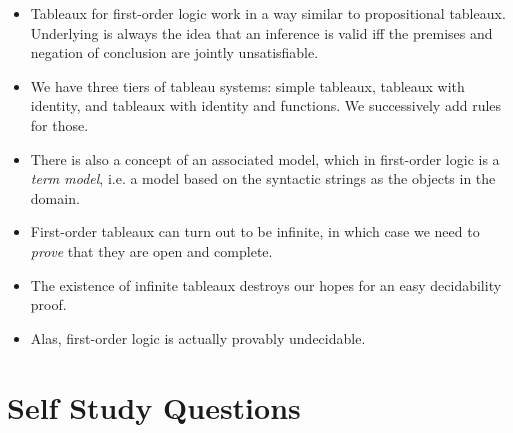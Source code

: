 \begin{itemize}
	
		\item Tableaux for first-order logic work in a way similar to propositional tableaux. Underlying is always the idea that an inference is valid iff the premises and negation of conclusion are jointly unsatisfiable.				
		\item We have three tiers of tableau systems: simple tableaux, tableaux with identity, and tableaux with identity and functions. We successively add rules for those.
		
		\item There is also a concept of an associated model, which in first-order logic is a \emph{term model}, i.e. a model based on the syntactic strings as the objects in the domain.
		
		\item First-order tableaux can turn out to be infinite, in which case we need to \emph{prove} that they are open and complete.
		
		\item The existence of infinite tableaux destroys our hopes for an easy decidability proof.
		
		\item Alas, first-order logic is actually provably undecidable.
	
	\end{itemize}


\section{Self Study Questions}

